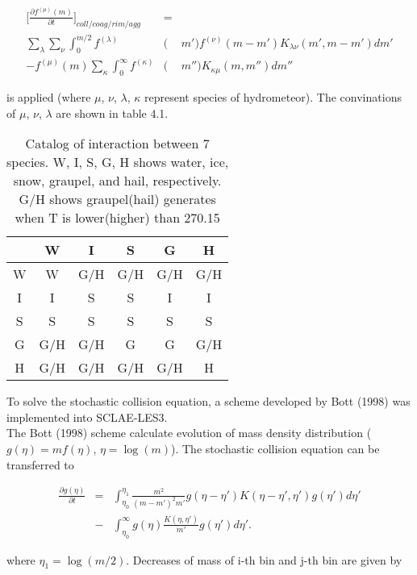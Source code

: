 \begin{eqnarray}
\Bigr[\frac{\partial f^{(\mu)}(m)}{\partial t}\Bigr]_{coll/coag/rim/agg}&=&\nonumber\\
\sum_{\lambda}\sum_{\nu}\int_{0}^{m/2}f^{(\lambda)}&(&m')f^{(\nu)}(m-m')K_{\lambda\nu}(m',m-m')dm' \nonumber\\
-f^{(\mu)}(m)\sum_{\kappa}\int_0^{\infty}f^{(\kappa)}&(&m'')K_{\kappa\mu}(m,m'')dm''
\end{eqnarray}

is applied (where $\mu$, $\nu$, $\lambda$, $\kappa$ represent species of hydrometeor). The convinations of $\mu$, $\nu$, $\lambda$ are shown in table 4.1.

\begin{table}[h]
\begin{center}
\caption{Catalog of interaction between 7 species. W, I, S, G, H shows water, ice, snow, graupel, and hail, respectively. G/H shows graupel(hail) generates when T is lower(higher) than 270.15}
\begin{tabular}{cccccc}
\hline
     & W   & I   & S   & G   & H   \\ \hline\hline
W    & W   & G/H & G/H & G/H & G/H \\ \hline
I    & I   & S   & S   & I   & I   \\ \hline
S    & S   & S   & S   & S   & S   \\ \hline
G    & G/H & G/H & G   & G   & G/H \\ \hline
H    & G/H & G/H & G/H & G/H & H   \\ \hline
\end{tabular}
\end{center}
\end{table}


To solve the stochastic collision equation, a scheme developed by Bott (1998) was implemented into SCLAE-LES3.\\
The Bott (1998) scheme calculate evolution of mass density distribution ($g(\eta)=mf(\eta)$, $\eta=\log(m)$). The stochastic collision equation can be transferred to

\begin{eqnarray}
\frac{\partial g(\eta)}{\partial t}&=&\int_{\eta_{0}}^{\eta_{1}}\frac{m^{2}}{(m-m')^{2} m'}g(\eta-\eta') K(\eta-\eta',\eta')g(\eta')d\eta' \nonumber\\
&-&\int_{\eta_{0}}^{\infty} g(\eta)\frac{K(\eta,\eta')}{m'}g(\eta')d\eta'.
\end{eqnarray}

 where $\eta_{1}=\log(m/2)$. Decreases of mass of i-th bin and j-th bin are given by


